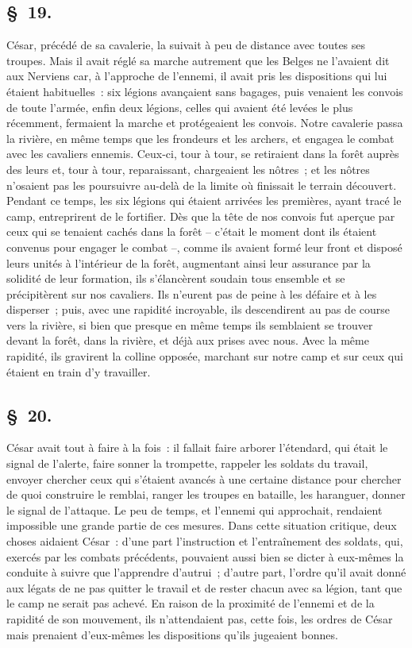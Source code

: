 \documentclass[french,twoside]{book} %
\begin{document}
\subsection[{§ 19.}]{ \textsc{§ 19.} }
\noindent César, précédé de sa cavalerie, la suivait à peu de distance avec toutes ses troupes. Mais il avait réglé sa marche autrement que les Belges ne l’avaient dit aux Nerviens car, à l’approche de l’ennemi, il avait pris les dispositions qui lui étaient habituelles : six légions avançaient sans bagages, puis venaient les convois de toute l’armée, enfin deux légions, celles qui avaient été levées le plus récemment, fermaient la marche et protégeaient les convois. Notre cavalerie passa la rivière, en même temps que les frondeurs et les archers, et engagea le combat avec les cavaliers ennemis. Ceux-ci, tour à tour, se retiraient dans la forêt auprès des leurs et, tour à tour, reparaissant, chargeaient les nôtres ; et les nôtres n’osaient pas les poursuivre au-delà de la limite où finissait le terrain découvert. Pendant ce temps, les six légions qui étaient arrivées les premières, ayant tracé le camp, entreprirent de le fortifier. Dès que la tête de nos convois fut aperçue par ceux qui se tenaient cachés dans la forêt – c’était le moment dont ils étaient convenus pour engager le combat –, comme ils avaient formé leur front et disposé leurs unités à l’intérieur de la forêt, augmentant ainsi leur assurance par la solidité de leur formation, ils s’élancèrent soudain tous ensemble et se précipitèrent sur nos cavaliers. Ils n’eurent pas de peine à les défaire et à les disperser ; puis, avec une rapidité incroyable, ils descendirent au pas de course vers la rivière, si bien que presque en même temps ils semblaient se trouver devant la forêt, dans la rivière, et déjà aux prises avec nous. Avec la même rapidité, ils gravirent la colline opposée, marchant sur notre camp et sur ceux qui étaient en train d’y travailler.
\subsection[{§ 20.}]{ \textsc{§ 20.} }
\noindent César avait tout à faire à la fois : il fallait faire arborer l’étendard, qui était le signal de l’alerte, faire sonner la trompette, rappeler les soldats du travail, envoyer chercher ceux qui s’étaient avancés à une certaine distance pour chercher de quoi construire le remblai, ranger les troupes en bataille, les haranguer, donner le signal de l’attaque. Le peu de temps, et l’ennemi qui approchait, rendaient impossible une grande partie de ces mesures. Dans cette situation critique, deux choses aidaient César : d’une part l’instruction et l’entraînement des soldats, qui, exercés par les combats précédents, pouvaient aussi bien se dicter à eux-mêmes la conduite à suivre que l’apprendre d’autrui ; d’autre part, l’ordre qu’il avait donné aux légats de ne pas quitter le travail et de rester chacun avec sa légion, tant que le camp ne serait pas achevé. En raison de la proximité de l’ennemi et de la rapidité de son mouvement, ils n’attendaient pas, cette fois, les ordres de César mais prenaient d’eux-mêmes les dispositions qu’ils jugeaient bonnes.
\end{document}
